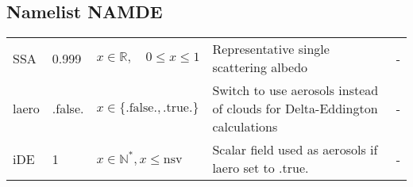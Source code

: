\documentclass[twoside,11pt,fleqn,a4paper,english,openright]{report}
\begin{document}
\newpage
\subsection{Namelist NAMDE}\label{par:deltaeddington}

\begin{center}
  \tablelasttail{
        &&&&\\\hline
  }
\begin{supertabular}{|l|p{2cm}|p{4cm}|p{6cm}|l|}
  SSA		& 0.999	& $x \in \mathbb{R}, \quad 0 \leq x \leq 1$	& Representative single scattering albedo & - \\
  \hypertarget{laero}{laero}	& .false.	& $x\in\{\text{.false.},\text{.true.}\}$	& Switch to use aerosols instead of clouds for Delta-Eddington calculations	& -\\
  iDE		& 1		& $x \in \mathbb{N}^*, x \leq \text{nsv}$	& Scalar field used as aerosols if laero set to .true. & - \\
\end{supertabular}
\end{center}
\end{document}
